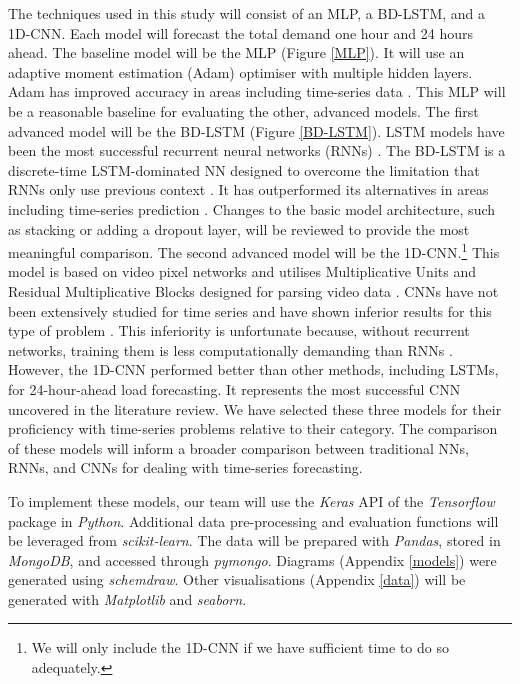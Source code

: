 \documentclass[mstat,12pt]{unswthesis}
\begin{document}
The techniques used in this study will consist of an MLP, a BD-LSTM, and a 1D-CNN. Each model will forecast the total demand one hour and 24 hours ahead. The baseline model will be the MLP (Figure \ref{MLP}). It will use an adaptive moment estimation (Adam) optimiser with multiple hidden layers. Adam has improved accuracy in areas including time-series data \cite{Chandra2021}. This MLP will be a reasonable baseline for evaluating the other, advanced models. The first advanced model will be the BD-LSTM (Figure \ref{BD-LSTM}). LSTM models have been the most successful recurrent neural networks (RNNs) \cite{Yu2019}. The BD-LSTM is a discrete-time LSTM-dominated NN designed to overcome the limitation that RNNs only use previous context \cite{Yu2019}. It has outperformed its alternatives in areas including time-series prediction \cite{Chandra2021}. Changes to the basic model architecture, such as stacking or adding a dropout layer, will be reviewed to provide the most meaningful comparison. The second advanced model will be the 1D-CNN.\footnote{We will only include the 1D-CNN if we have sufficient time to do so adequately.} This model is based on video pixel networks and utilises Multiplicative Units and Residual Multiplicative Blocks designed for parsing video data \cite{Yazici2022}. CNNs have not been extensively studied for time series \cite{Yazici2022} and have shown inferior results for this type of problem \cite{Chandra2021}. This inferiority is unfortunate because, without recurrent networks, training them is less computationally demanding than RNNs \cite{Yazici2022}. However, the 1D-CNN performed better than other methods, including LSTMs, for 24-hour-ahead load forecasting. It represents the most successful CNN uncovered in the literature review. We have selected these three models for their proficiency with time-series problems relative to their category. The comparison of these models will inform a broader comparison between traditional NNs, RNNs, and CNNs for dealing with time-series forecasting.\newline

To implement these models, our team will use the \textit{Keras} API of the \textit{Tensorflow} package in \textit{Python}. Additional data pre-processing and evaluation functions will be leveraged from \textit{scikit-learn}. The data will be prepared with \textit{Pandas}, stored in \textit{MongoDB}, and accessed through \textit{pymongo}. Diagrams (Appendix \ref{models}) were generated using \textit{schemdraw}. Other visualisations (Appendix \ref{data}) will be generated with \textit{Matplotlib} and \textit{seaborn}.\newline
\end{document}
